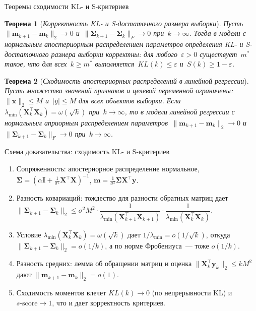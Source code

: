 \documentclass[10pt,pdf,hyperref={unicode}]{beamer}
\newtheorem{rustheorem}{Теорема}
\begin{document}
\begin{frame}{Теоремы сходимости KL- и S-критериев}
\justifying
\small
\begin{rustheorem}[\emph{Корректность KL- и S-достаточного размера выборки}]
    \justifying
    Пусть~$\|\mathbf{m}_{k+1} - \mathbf{m}_k\|_2 \to 0$ и~$\|\bm{\Sigma}_{k+1} - \bm{\Sigma}_k\|_{F}\to 0$ при~$k\to \infty$.
    Тогда в модели с нормальным апостериорным распределением параметров определения KL- и S-достаточного размера выборки корректны: для любого~$\varepsilon > 0$ существует~$m^*$ такое, что для всех~$k\geqslant m^*$ выполняется~$KL(k)\leqslant\varepsilon$ и~$S(k)\geqslant 1-\varepsilon$.
\end{rustheorem}

\begin{rustheorem}[\emph{Сходимость апостериорных распределений в линейной регрессии}]
    \justifying
    Пусть множества значений признаков и целевой переменной ограничены: $\|\mathbf{x}\|_2\leqslant M$ и~$|y|\leqslant M$ для всех объектов выборки.
    Если~$\lambda_{\min}\left(\mathbf{X}^{\top}_k \mathbf{X}_k \right) = \omega(\sqrt{k})$ при~$k\to \infty$, то в модели линейной регрессии с нормальным априорным распределением параметров~$\|\mathbf{m}_{k+1} - \mathbf{m}_k\|_2\to 0$ и~$\|\bm{\Sigma}_{k+1} - \bm{\Sigma}_k\|_{F}\to 0$ при~$k\to \infty$.
\end{rustheorem}
\end{frame}
\begin{frame}{Схема доказательства: сходимость KL- и S-критериев}
\justifying
\small
\begin{enumerate}
    \item Сопряженность: апостериорное распределение нормальное, $\mathbf{\Sigma} = \left(\alpha\mathbf{I} + \frac{1}{\sigma^2}\mathbf{X}^{\top}\mathbf{X}\right)^{-1}$, $\mathbf{m} = \frac{1}{\sigma^2}\mathbf{\Sigma}\mathbf{X}^{\top}\mathbf{y}$.
    \item Разность ковариаций: тождество для разности обратных матриц дает $\|\mathbf{\Sigma}_{k+1}-\mathbf{\Sigma}_k\|_2 \leqslant \sigma^2 M^2 \cdot \dfrac{1}{\lambda_{\min}(\mathbf{X}_{k+1}^{\top}\mathbf{X}_{k+1})}\cdot\dfrac{1}{\lambda_{\min}(\mathbf{X}_k^{\top}\mathbf{X}_k)}$.
    \item Условие $\lambda_{\min}(\mathbf{X}_k^{\top}\mathbf{X}_k) = \omega(\sqrt{k})$ дает $1/\lambda_{\min} = o(1/\sqrt{k})$, откуда $\|\mathbf{\Sigma}_{k+1}-\mathbf{\Sigma}_k\|_2 = o(1/k)$, а по норме Фробениуса~--- тоже $o(1/k)$.
    \item Разность средних: лемма об обращении матриц и оценка $\|\mathbf{X}_k^{\top}\mathbf{y}_k\|_2 \leqslant kM^2$ дают $\|\mathbf{m}_{k+1}-\mathbf{m}_k\|_2 = o(1)$.
    \item Сходимость моментов влечет $KL(k)\to 0$ (по непрерывности KL) и $s\text{-score}\to 1$, что и дает корректность критериев.
\end{enumerate}
\end{frame}
\end{document}
